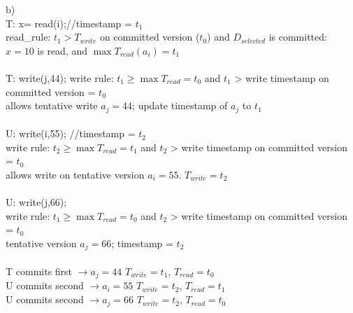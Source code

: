\documentclass{article}
\begin{document}
    \begin{enumerate}b)\\
        T: x= read(i);//timestamp = $t_1$\\
        read_rule: $t_1 > T_{write}$ on committed version ($t_0$) and $D_{selected}$ is committed:\\
        $x = 10$ is read, and $\max T_{read} (a_i) = t_1$\\
        \\
        T: write(j,44);
        write rule: $t_1 \geq \max T_{read} = t_0$ and $t_1$ > write timestamp on committed version = $t_0$\\
        allows tentative write $a_j = 44$; update timestamp of $a_j$ to $t_1$\\
        \\
        U: write(i,55); //timestamp = $t_2$\\
        write rule: $t_2 \geq \max T_{read} = t_1$ and $t_2$ > write timestamp on committed version = $t_0$\\
        allows write on tentative version $a_i = 55$. $T_{write} = t_2$\\
        \\
        U: write(j,66);\\
        write rule: $t_1 \geq \max T_{read} = t_0$ and $t_2$ > write timestamp on committed version = $t_0$\\
        tentative version $a_j = 66$; timestamp = $t_2$\\
        \\
        T commits first $\rightarrow a_j = 44$ $T_{write} = t_1$, $T_{read} = t_0$\\
        U commits second $\rightarrow a_i = 55$ $T_{write} = t_2$, $T_{read} = t_1$\\
        U commits second $\rightarrow a_j = 66$ $T_{write} = t_2$, $T_{read} = t_0$
    \end{enumerate}
\end{document}
